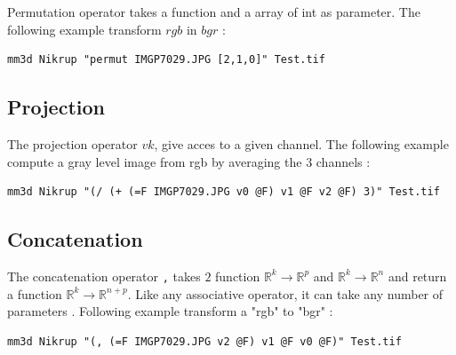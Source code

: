 Permutation operator takes a function and a array of int as parameter.
The following example transform $rgb$ in $bgr$ :

\begin{verbatim}
mm3d Nikrup "permut IMGP7029.JPG [2,1,0]" Test.tif
\end{verbatim}


\subsection{Projection}

The projection operator $vk$, give acces to a given channel.
The following example compute a gray level image from 
rgb by averaging the $3$ channels :


\begin{verbatim}
mm3d Nikrup "(/ (+ (=F IMGP7029.JPG v0 @F) v1 @F v2 @F) 3)" Test.tif
\end{verbatim}

\subsection{Concatenation}

The concatenation operator {\tt ,}  takes $2$ function 
$\mathbb{R}^k  \rightarrow  \mathbb{R}^p $ and
$\mathbb{R}^k  \rightarrow  \mathbb{R}^n $ and return a function
$\mathbb{R}^k  \rightarrow  \mathbb{R}^{n+p}$. Like any
associative operator, it can take any number of parameters .
Following example transform a "rgb" to "bgr" :


\begin{verbatim}
mm3d Nikrup "(, (=F IMGP7029.JPG v2 @F) v1 @F v0 @F)" Test.tif
\end{verbatim}






